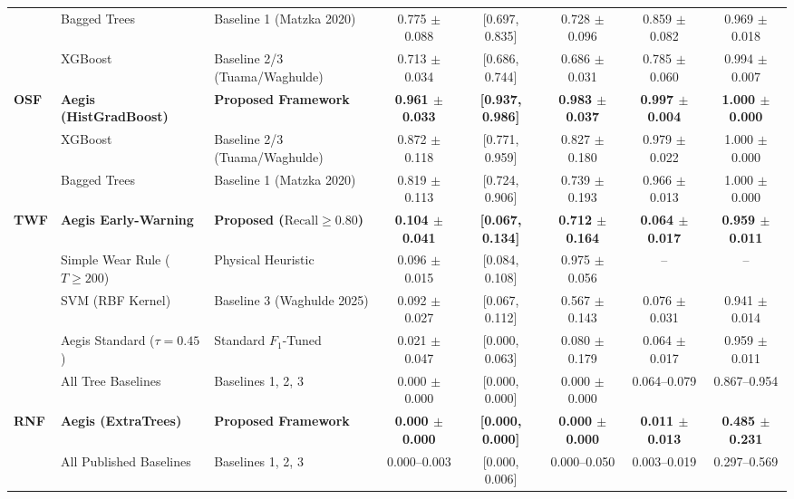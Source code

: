 \documentclass[conference]{IEEEtran}
\begin{document}
\begin{table}[t]
\begin{tabular}{lllccccc}
 & Bagged Trees & Baseline 1 (Matzka 2020) & 0.775 $\pm$ 0.088 & [0.697, 0.835] & 0.728 $\pm$ 0.096 & 0.859 $\pm$ 0.082 & 0.969 $\pm$ 0.018 \\
 & XGBoost & Baseline 2/3 (Tuama/Waghulde) & 0.713 $\pm$ 0.034 & [0.686, 0.744] & 0.686 $\pm$ 0.031 & 0.785 $\pm$ 0.060 & 0.994 $\pm$ 0.007 \\
\midrule
\multirow{3}{*}{\textbf{OSF}} & \textbf{Aegis (HistGradBoost)} & \textbf{Proposed Framework} & \textbf{0.961 $\pm$ 0.033} & \textbf{[0.937, 0.986]} & \textbf{0.983 $\pm$ 0.037} & \textbf{0.997 $\pm$ 0.004} & \textbf{1.000 $\pm$ 0.000} \\
 & XGBoost & Baseline 2/3 (Tuama/Waghulde) & 0.872 $\pm$ 0.118 & [0.771, 0.959] & 0.827 $\pm$ 0.180 & 0.979 $\pm$ 0.022 & 1.000 $\pm$ 0.000 \\
 & Bagged Trees & Baseline 1 (Matzka 2020) & 0.819 $\pm$ 0.113 & [0.724, 0.906] & 0.739 $\pm$ 0.193 & 0.966 $\pm$ 0.013 & 1.000 $\pm$ 0.000 \\
\midrule
\multirow{4}{*}{\textbf{TWF}} & \textbf{Aegis Early-Warning} & \textbf{Proposed ($\text{Recall} \ge 0.80$)} & \textbf{0.104 $\pm$ 0.041} & \textbf{[0.067, 0.134]} & \textbf{0.712 $\pm$ 0.164} & \textbf{0.064 $\pm$ 0.017} & \textbf{0.959 $\pm$ 0.011} \\
 & Simple Wear Rule ($T \ge 200$) & Physical Heuristic & 0.096 $\pm$ 0.015 & [0.084, 0.108] & 0.975 $\pm$ 0.056 & -- & -- \\
 & SVM (RBF Kernel) & Baseline 3 (Waghulde 2025) & 0.092 $\pm$ 0.027 & [0.067, 0.112] & 0.567 $\pm$ 0.143 & 0.076 $\pm$ 0.031 & 0.941 $\pm$ 0.014 \\
 & Aegis Standard ($\tau = 0.45$) & Standard $F_1$-Tuned & 0.021 $\pm$ 0.047 & [0.000, 0.063] & 0.080 $\pm$ 0.179 & 0.064 $\pm$ 0.017 & 0.959 $\pm$ 0.011 \\
 & All Tree Baselines & Baselines 1, 2, 3 & 0.000 $\pm$ 0.000 & [0.000, 0.000] & 0.000 $\pm$ 0.000 & 0.064--0.079 & 0.867--0.954 \\
\midrule
\multirow{2}{*}{\textbf{RNF}} & \textbf{Aegis (ExtraTrees)} & \textbf{Proposed Framework} & \textbf{0.000 $\pm$ 0.000} & \textbf{[0.000, 0.000]} & \textbf{0.000 $\pm$ 0.000} & \textbf{0.011 $\pm$ 0.013} & \textbf{0.485 $\pm$ 0.231} \\
 & All Published Baselines & Baselines 1, 2, 3 & 0.000--0.003 & [0.000, 0.006] & 0.000--0.050 & 0.003--0.019 & 0.297--0.569 \\
\bottomrule
\end{tabular}
\label{tab:main_benchmark}
\end{table}
\end{document}
